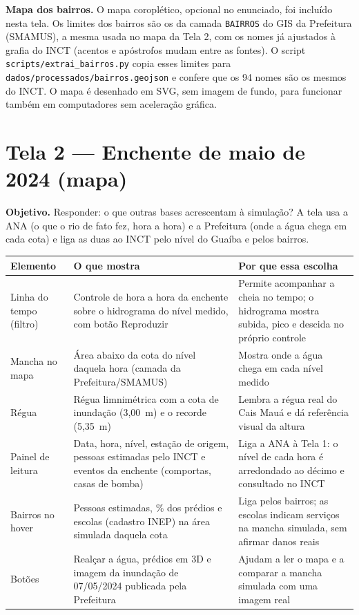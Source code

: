 \documentclass[11pt,a4paper]{article}
\begin{document}
\textbf{Mapa dos bairros.} O mapa coroplético, opcional no enunciado, foi incluído nesta tela. Os limites dos bairros são os da camada \texttt{BAIRROS} do GIS da Prefeitura (SMAMUS), a mesma usada no mapa da Tela 2, com os nomes já ajustados à grafia do INCT (acentos e apóstrofos mudam entre as fontes). O script \texttt{scripts/extrai\_bairros.py} copia esses limites para \texttt{dados/processados/bairros.geojson} e confere que os 94 nomes são os mesmos do INCT. O mapa é desenhado em SVG, sem imagem de fundo, para funcionar também em computadores sem aceleração gráfica.

\section{Tela 2 --- Enchente de maio de 2024 (mapa)}
\textbf{Objetivo.} Responder: o que outras bases acrescentam à simulação? A tela usa a ANA (o que o rio de fato fez, hora a hora) e a Prefeitura (onde a água chega em cada cota) e liga as duas ao INCT pelo nível do Guaíba e pelos bairros.

\begin{longtable}{L{3.2cm} L{6.2cm} L{6.2cm}}
\toprule
Elemento & O que mostra & Por que essa escolha\\
\midrule
\endhead
Linha do tempo (filtro) & Controle de hora a hora da enchente sobre o hidrograma do nível medido, com botão Reproduzir & Permite acompanhar a cheia no tempo; o hidrograma mostra subida, pico e descida no próprio controle\\
Mancha no mapa & Área abaixo da cota do nível daquela hora (camada da Prefeitura/SMAMUS) & Mostra onde a água chega em cada nível medido\\
Régua & Régua limnimétrica com a cota de inundação (3,00~m) e o recorde (5,35~m) & Lembra a régua real do Cais Mauá e dá referência visual da altura\\
Painel de leitura & Data, hora, nível, estação de origem, pessoas estimadas pelo INCT e eventos da enchente (comportas, casas de bomba) & Liga a ANA à Tela 1: o nível de cada hora é arredondado ao décimo e consultado no INCT\\
Bairros no hover & Pessoas estimadas, \% dos prédios e escolas (cadastro INEP) na área simulada daquela cota & Liga pelos bairros; as escolas indicam serviços na mancha simulada, sem afirmar danos reais\\
Botões & Realçar a água, prédios em 3D e imagem da inundação de 07/05/2024 publicada pela Prefeitura & Ajudam a ler o mapa e a comparar a mancha simulada com uma imagem real\\
\bottomrule
\end{longtable}
\end{document}
